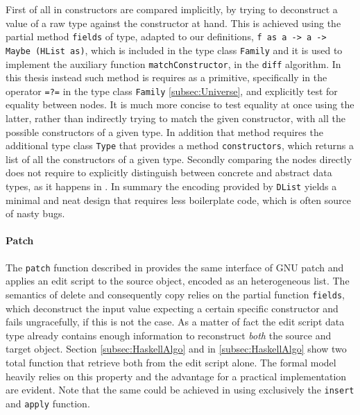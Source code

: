 \documentclass[../Thesis.tex]{subfiles}
\begin{document}
	First of all in \cite{Lemp09} constructors are compared implicitly,
	by trying to deconstruct a value of a raw type against the constructor
	at hand. This is achieved using the partial method \texttt{fields} of type,
	adapted to our definitions, \texttt{f as a -> a -> Maybe (HList as)},
	which is included in the type class \texttt{Family} and it is used to
	implement the auxiliary function \texttt{matchConstructor}, in the
	\texttt{diff} algorithm.
	In this thesis instead such method is requires as a primitive,
	specifically in the operator \texttt{=?=} in the type class \texttt{Family} 
	\ref{subsec:Universe}, and explicitly test for equality between nodes.
	It is much more concise to test equality at once using the latter,
	rather than indirectly trying to match the given constructor,
	with all the possible constructors of a given type.
	In addition that method requires the additional type class \texttt{Type} that 
	provides a method \texttt{constructors}, which 
	returns a list of all the constructors of a given type.
	Secondly comparing the nodes directly does not require to 
	explicitly distinguish between concrete and abstract data types, as 
	it happens in \cite{Lemp09}.
	In summary the encoding provided by \texttt{DList} yields a
	minimal and neat design that requires less boilerplate code,
	which is often source of nasty bugs.
	
	\paragraph{Patch}
	The \texttt{patch} function described in \cite{Lemp09} provides the 
	same interface of GNU patch and applies an edit script 
	to the source object, encoded as an heterogeneous list.
	The semantics of delete and consequently copy relies
	on the partial function \texttt{fields}, which deconstruct the input
	value expecting a certain specific constructor and fails ungracefully,
	if this is not the case.
	As a matter of fact the edit script data type already contains enough 
	information to reconstruct \emph{both} the source and target object.
	Section \ref{subsec:HaskellAlgo} and in \ref{subsec:HaskellAlgo} show
	two total function that retrieve both from the edit script alone.
	The formal model heavily relies on this property and the advantage for a 
	practical implementation	are evident.
	Note that 	the same could be achieved in \cite{Lemp09} using
	exclusively the \texttt{insert} and \texttt{apply} function.
\end{document}
